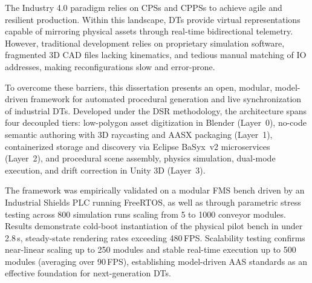 
%

The Industry 4.0 paradigm relies on \glspl{CPS} and \glspl{CPPS} to achieve agile and resilient production. Within this landscape, \glspl{DT} provide virtual representations capable of mirroring physical assets through real-time bidirectional telemetry. However, traditional development relies on proprietary simulation software, fragmented 3D \gls{CAD} files lacking kinematics, and tedious manual matching of \gls{IO} addresses, making reconfigurations slow and error-prone.

To overcome these barriers, this dissertation presents an open, modular, model-driven framework for automated procedural generation and live synchronization of industrial \glspl{DT}. Developed under the \gls{DSR} methodology, the architecture spans four decoupled tiers: low-polygon asset digitization in Blender (Layer~0), no-code semantic authoring with 3D raycasting and \gls{AASX} packaging (Layer~1), containerized storage and discovery via Eclipse BaSyx~v2 microservices (Layer~2), and procedural scene assembly, physics simulation, dual-mode execution, and drift correction in Unity 3D (Layer~3).

The framework was empirically validated on a modular \gls{FMS} bench driven by an Industrial Shields \gls{PLC} running FreeRTOS, as well as through parametric stress testing across 800 simulation runs scaling from 5 to 1000 conveyor modules. Results demonstrate cold-boot instantiation of the physical pilot bench in under 2.8\,s, steady-state rendering rates exceeding 480\,\gls{FPS}. Scalability testing confirms near-linear scaling up to 250 modules and stable real-time execution up to 500 modules (averaging over 90\,\gls{FPS}), establishing model-driven \gls{AAS} standards as an effective foundation for next-generation \glspl{DT}.

